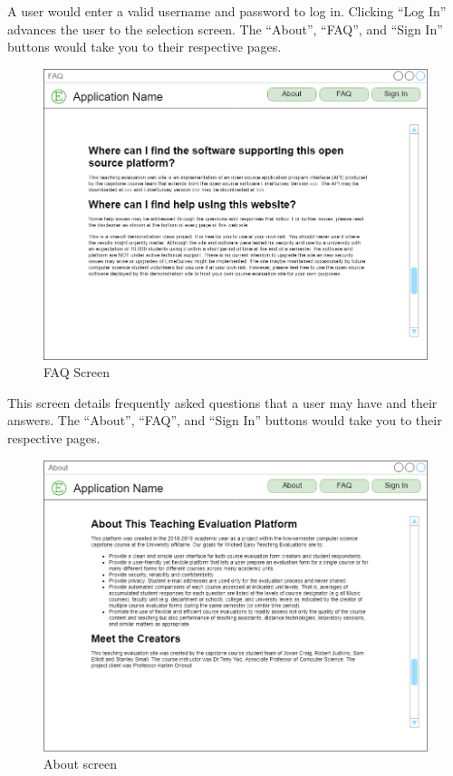 \documentclass{article}
\begin{document}
A user would enter a valid username and password to log in. Clicking ``Log In'' advances the user to the selection screen. The ``About'', ``FAQ'', and ``Sign In'' buttons would take you to their respective pages.

\newpage

\begin{center}
\begin{figure}[H]
    \centering
    \caption{FAQ Screen}
    \includegraphics[width=6.5in]{images/faq_screen.png}
\end{figure}
\end{center}

This screen details frequently asked questions that a user may have and their answers. The ``About'', ``FAQ'', and ``Sign In'' buttons would take you to their respective pages.

\newpage

\begin{center}
\begin{figure}[H]
    \centering
    \caption{About screen}
    \includegraphics[width=6.5in]{images/about_screen.png}
\end{figure}
\end{center}
\end{document}
